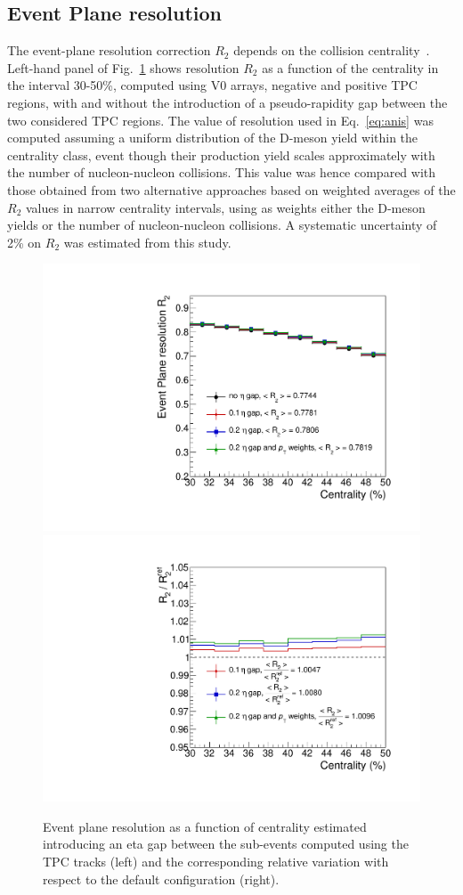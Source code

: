 \subsection{Event Plane resolution}
\label{sec:EPreso}
The event-plane resolution correction $R_2$ depends on the 
collision centrality~\cite{Abelev:2014ipa}. Left-hand panel of Fig.~\ref{fig:EtaGapSyst} shows
resolution $R_2$ as a function of the centrality in the interval
30-50\%, computed using V0 arrays, negative and positive TPC
regions, with and without the introduction of a 
pseudo-rapidity gap between the two considered TPC regions.
The value of resolution used in Eq.~\ref{eq:anis} was computed
 assuming a uniform distribution of the D-meson yield within 
 the centrality class, event though their production yield
scales approximately with the number of nucleon-nucleon collisions.
This value was hence compared with those obtained from two alternative approaches
based on weighted averages of the $R_2$ values in narrow centrality 
intervals, using as weights either the D-meson yields or the number of 
nucleon-nucleon collisions. 
A systematic uncertainty of 2\% on $R_2$ was estimated from 
this study.
\begin{figure}
\centering
  \includegraphics[width=.49\textwidth]{FigCap5/EPresolution_VZERO_NonFlowSyst.pdf}
  \includegraphics[width=.49\textwidth]{FigCap5/EPresolution_VZERO_NonFlowSyst_ratio.pdf}
\caption{Event plane resolution as a function of centrality estimated introducing an eta gap between the sub-events computed using the TPC tracks (left) and the corresponding relative variation with respect to the default configuration (right).}
\label{fig:EtaGapSyst}
\end{figure}

